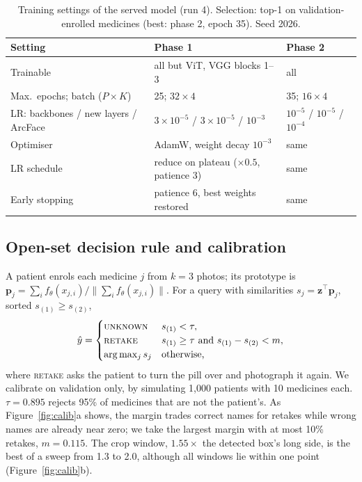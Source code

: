 \begin{table}[t]
  \caption{Training settings of the served model (run 4). Selection: top-1 on validation-enrolled medicines (best:
    phase 2, epoch 35). Seed 2026.}
  \label{tab:train}
  \centering
  \small
  \begin{tabular}{@{}lll@{}}
    \toprule
    Setting & Phase 1 & Phase 2 \\
    \midrule
    Trainable & all but ViT, VGG blocks 1--3 & all \\
    Max.\ epochs; batch ($P\times K$) & 25; $32\times4$ & 35; $16\times4$ \\
    LR: backbones / new layers / ArcFace & $3\!\times\!10^{-5}$ / $3\!\times\!10^{-5}$ / $10^{-3}$
      & $10^{-5}$ / $10^{-5}$ / $10^{-4}$ \\
    Optimiser & AdamW, weight decay $10^{-3}$ & same \\
    LR schedule & reduce on plateau ($\times0.5$, patience 3) & same \\
    Early stopping & patience 6, best weights restored & same \\
    \bottomrule
  \end{tabular}
\end{table}

\subsection{Open-set decision rule and calibration}
\label{sec:decision}

A patient enrols each medicine $j$ from $k{=}3$ photos; its prototype is
$\mathbf{p}_j=\sum_i f_\theta(x_{j,i})/\lVert\sum_i f_\theta(x_{j,i})\rVert$. For a query with similarities
$s_j=\mathbf{z}^\top\mathbf{p}_j$, sorted $s_{(1)}\ge s_{(2)}$,
\begin{equation}
  \hat y=\begin{cases}
    \textsc{unknown} & s_{(1)}<\tau,\\
    \textsc{retake} & s_{(1)}\ge\tau \text{ and } s_{(1)}-s_{(2)}<m,\\
    \arg\max_j s_j & \text{otherwise,}
  \end{cases}
  \label{eq:decision}
\end{equation}
where \textsc{retake} asks the patient to turn the pill over and photograph it again. We calibrate on validation only,
by simulating 1,000 patients with 10 medicines each. $\tau=0.895$ rejects 95\% of medicines that are not the
patient's. As Figure~\ref{fig:calib}a shows, the margin trades correct names for retakes while wrong names are
already near zero; we take the largest margin with at most 10\% retakes, $m=0.115$. The crop window, $1.55\times$ the
detected box's long side, is the best of a sweep from 1.3 to 2.0, although all windows lie within one point
(Figure~\ref{fig:calib}b).

